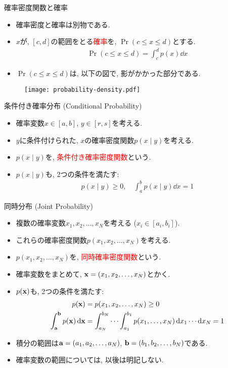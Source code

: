 \documentclass[dvipdfmx,notheorems,t]{beamer}
\begin{document}
\begin{frame}{確率密度関数と確率}
\begin{itemize}
  \item 確率密度と確率は別物である.
  \item $x$が, $[c, d]$の範囲をとる\textcolor{red}{確率}を, $\Pr(c \le x \le d)$とする.
  \begin{align*}
    \Pr(c \le x \le d) = \int_c^d p(x) \dd{x}
  \end{align*}
  \item $\Pr(c \le x \le d)$は, 以下の図で, 影がかかった部分である.
\end{itemize}

\begin{figure}
  \centering
  \texttt{[image: probability-density.pdf]}
\end{figure}
\end{frame}

\begin{frame}{条件付き確率分布 (Conditional Probability)}
\begin{itemize}
  \item 確率変数$x \in [a, b]$, $y \in [r, s]$を考える.
  \item $y$に条件付けられた, $x$の確率密度関数$p(x \mid y)$を考える.
  \item $p(x \mid y)$を, \textcolor{red}{条件付き確率密度関数}という.
  \item $p(x \mid y)$も, 2つの条件を満たす:
  \begin{align*}
    p(x \mid y) \ge 0, \quad \int_a^b p(x \mid y) \dd{x} = 1
  \end{align*}
\end{itemize}
\end{frame}

\begin{frame}{同時分布 (Joint Probability)}
\begin{itemize}
  \item 複数の確率変数$x_1, x_2, \ldots, x_N$を考える ($x_i \in [a_i, b_i]$).
  \item これらの確率密度関数$p(x_1, x_2, \ldots, x_N)$を考える.
  \item $p(x_1, x_2, \ldots, x_N)$を, \textcolor{red}{同時確率密度関数}という.
  \item 確率変数をまとめて, $\vb{x} = (x_1, x_2, \ldots, x_N)$とかく.
  \item $p(\vb{x})$も, 2つの条件を満たす:
  \begin{align*}
    p(\vb{x}) &= p(x_1, x_2, \ldots, x_N) \ge 0 \\
    \int_{\vb{a}}^{\vb{b}} p(\vb{x}) \dd{\vb{x}}
      &= \int_{a_N}^{b_N} \cdots \int_{a_1}^{b_1}
        p(x_1, \ldots, x_N) \dd{x_1} \cdots \dd{x_N} = 1
  \end{align*}
  \item 積分の範囲は$\vb{a} = (a_1, a_2, \ldots, a_N)$, $\vb{b} = (b_1, b_2, \ldots, b_N)$である.
  \item 確率変数の範囲については, 以後は明記しない.
\end{itemize}
\end{frame}
\end{document}
